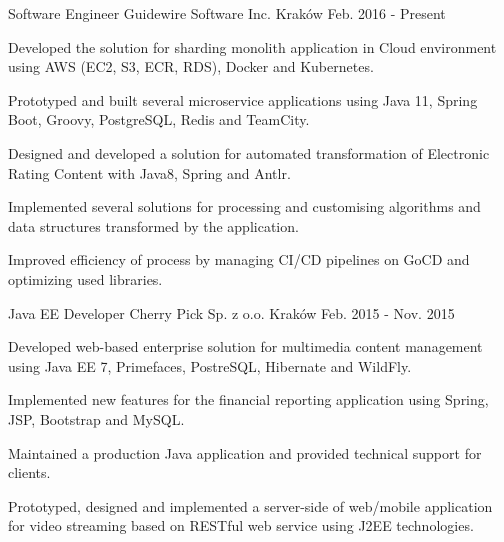 

\begin{cventries}

  \cventry
    {Software Engineer} %
    {Guidewire Software Inc.} %
    {Kraków} %
    {Feb. 2016 - Present} %
    {
      \begin{cvitems} %
        \item {Developed the solution for sharding monolith application in Cloud environment using AWS (EC2, S3, ECR, RDS), Docker and Kubernetes.}
        \item {Prototyped and built several microservice applications using Java 11, Spring Boot, Groovy, PostgreSQL, Redis and TeamCity.}
        \item {Designed and developed a solution for automated transformation of Electronic Rating Content with Java8, Spring and Antlr.}
        \item {Implemented several solutions for processing and customising algorithms and data structures transformed by the application.}
        \item {Improved efficiency of process by managing CI/CD pipelines on GoCD and optimizing used libraries.}
      \end{cvitems}
    }

  \cventry
    {Java EE Developer} %
    {Cherry Pick Sp. z o.o.} %
    {Kraków} %
    {Feb. 2015 - Nov. 2015} %
    {
      \begin{cvitems} %
        \item {Developed web-based enterprise solution for multimedia content management using
Java EE 7, Primefaces, PostreSQL, Hibernate and WildFly.}
		\item {Implemented new features for the financial reporting application using Spring, JSP, Bootstrap and MySQL.}
		\item {Maintained a production Java application and provided technical support for clients.}
        \item {Prototyped, designed and implemented a server-side of web/mobile
application for video streaming based on RESTful web service using J2EE technologies.}
      \end{cvitems}
    }


\end{cventries}
